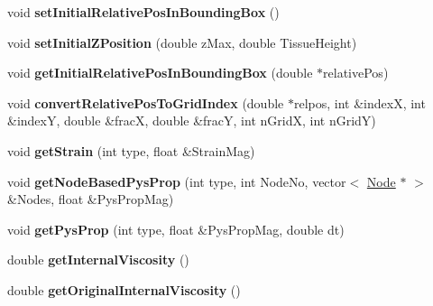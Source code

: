 \begin{DoxyCompactItemize}
\item 
\hypertarget{classShapeBase_a8c7a7578407be503531bf14af6d004d1}{}void {\bfseries set\+Initial\+Relative\+Pos\+In\+Bounding\+Box} ()\label{classShapeBase_a8c7a7578407be503531bf14af6d004d1}

\item 
\hypertarget{classShapeBase_a3e054f84b56303812eee5b3abeec9b2f}{}void {\bfseries set\+Initial\+Z\+Position} (double z\+Max, double Tissue\+Height)\label{classShapeBase_a3e054f84b56303812eee5b3abeec9b2f}

\item 
\hypertarget{classShapeBase_af2e6905d811de3ca73c0971b3fd21225}{}void {\bfseries get\+Initial\+Relative\+Pos\+In\+Bounding\+Box} (double $\ast$relative\+Pos)\label{classShapeBase_af2e6905d811de3ca73c0971b3fd21225}

\item 
\hypertarget{classShapeBase_ad34b6e8535ad7a534110f03792f5f5d1}{}void {\bfseries convert\+Relative\+Pos\+To\+Grid\+Index} (double $\ast$relpos, int \&index\+X, int \&index\+Y, double \&frac\+X, double \&frac\+Y, int n\+Grid\+X, int n\+Grid\+Y)\label{classShapeBase_ad34b6e8535ad7a534110f03792f5f5d1}

\item 
\hypertarget{classShapeBase_aecf99016ea7c36e0bff43a40e6a89df3}{}void {\bfseries get\+Strain} (int type, float \&Strain\+Mag)\label{classShapeBase_aecf99016ea7c36e0bff43a40e6a89df3}

\item 
\hypertarget{classShapeBase_ac1368b84a5ed722fa7b9f82656b49969}{}void {\bfseries get\+Node\+Based\+Pys\+Prop} (int type, int Node\+No, vector$<$ \hyperlink{classNode}{Node} $\ast$ $>$ \&Nodes, float \&Pys\+Prop\+Mag)\label{classShapeBase_ac1368b84a5ed722fa7b9f82656b49969}

\item 
\hypertarget{classShapeBase_abff91451c3465778ed89624d6196f7f6}{}void {\bfseries get\+Pys\+Prop} (int type, float \&Pys\+Prop\+Mag, double dt)\label{classShapeBase_abff91451c3465778ed89624d6196f7f6}

\item 
\hypertarget{classShapeBase_a51bc2c7303dfaae0687d1d785b077e81}{}double {\bfseries get\+Internal\+Viscosity} ()\label{classShapeBase_a51bc2c7303dfaae0687d1d785b077e81}

\item 
\hypertarget{classShapeBase_ac0651f685642cfddf6cefa3542ece51a}{}double {\bfseries get\+Original\+Internal\+Viscosity} ()\label{classShapeBase_ac0651f685642cfddf6cefa3542ece51a}


\end{DoxyCompactItemize}
